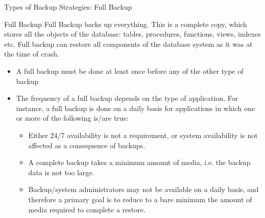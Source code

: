 \documentclass[aspectratio=169, xcolor=dvipsnames]{beamer}
\begin{document}
\begin{frame}{Types of Backup Strategies: Full Backup}
    \begin{block}{Full Backup}
        Full Backup backs up everything. This is a complete copy, which stores all the objects of the database: tables, procedures, functions, views, indexes etc. Full backup can restore all components of the database system as it was at the time of crash.
    \end{block}
    \begin{itemize}[<+->]
        \item A full backup must be done at least once before any of the other type of backup
        \item The frequency of a full backup depends on the type of application. For instance, a full backup is done on a daily basis for applications in which one or more of the following is/are true:
        \begin{itemize}
            \item[$\triangleright$] Either 24/7 availability is not a requirement, or system availability is not affected as a consequence of backups.
            \item[$\triangleright$] A complete backup takes a minimum amount of media, i.e. the backup data is not too large.
            \item[$\triangleright$] Backup/system administrators may not be available on a daily basis, and therefore a primary goal is to reduce to a bare minimum the amount of media required to complete a restore.
        \end{itemize}
    \end{itemize}
\end{frame}
\end{document}
